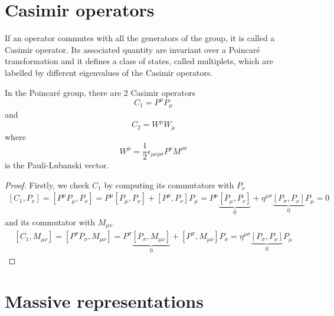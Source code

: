 \section{Casimir operators}
    If an operator commutes with all the generators of the group, it is called a Casimir operator. Its associated quantity are invariant over a Poincaré transformation and it defines a class of states, called multiplets, which are labelled by different eigenvalues of the Casimir operators.

    In the Poincaré group, there are 2 Casimir operators 
    \begin{equation} \label{c1}
        C_1 = P^\mu P_\mu 
    \end{equation}
    and 
    \begin{equation} \label{c2}
        C_2 = W^\mu W_\mu 
    \end{equation}
    where 
    \begin{equation}\label{w}
        W^\mu = \frac{1}{2} \epsilon_{\mu\nu\rho\sigma} P^\nu M^{\rho\sigma}
    \end{equation}
    is the Pauli-Lubanski vector.

    \begin{proof}
        Firstly, we check $C_1$ by computing its commutators with $P_\nu$
        \begin{equation*}
        \begin{aligned}
             [C_1, P_\nu] = [P^\mu P_\mu, P_\nu] = P^\mu [P_\mu, P_\nu] + [P^\mu, P_\nu] P_\mu = P^\mu \underbrace{[P_\mu, P_\nu]}_{0} + \eta^{\mu\sigma} \underbrace{[P_\sigma, P_\nu]}_{0} P_\mu = 0
        \end{aligned}
        \end{equation*}
        and its commutator with $M_{\mu\nu}$ 
        \begin{equation*}
        \begin{aligned}
             [C_1, M_{\mu\nu}] = [P^\sigma P_\sigma, M_{\mu\nu}] = P^\sigma \underbrace{[P_\sigma, M_{\mu\nu}]}_{0} + [P^\sigma, M_{\mu\nu}] P_\sigma = \eta^{\mu\sigma} \underbrace{[P_\sigma, P_\nu]}_{0} P_\mu
        \end{aligned}
        \end{equation*}
    \end{proof}

\section{Massive representations}

